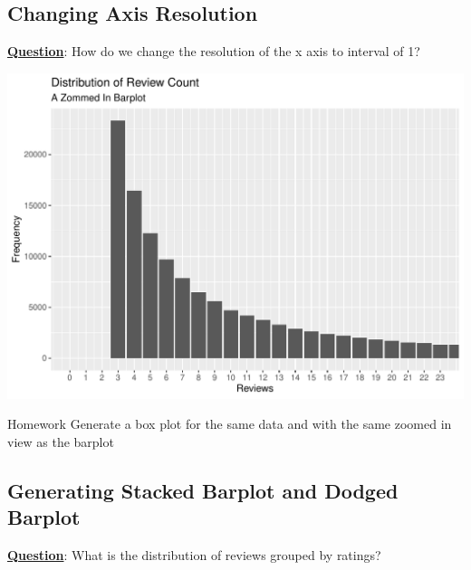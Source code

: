 \documentclass[12pt]{book}\usepackage{knitr}
\begin{document}
\subsection{Changing Axis Resolution}
\noindent \textbf{\underline{Question}}: How do we change the resolution of the x axis to interval of 1?
\begin{knitrout}
\color{fgcolor}\begin{kframe}
\begin{alltt}
 \hlkwb{<-}  \hlopt{+}
\hlstd{(}
                    \hlstd{=} \hlstd{(}\hlstd{)}
                  \hlstd{)}  
\end{alltt}


{\ttfamily\noindent\color{warningcolor}{\#\# Warning: Use of `cleansedBusiness\$review\_count` is discouraged. Use `review\_count` instead.}}\end{kframe}
\includegraphics[width=\maxwidth]{figure/Change_Axis_Resolution-1} 

\end{knitrout}

\begin{DIY}{Homework}
\noindent Generate a box plot for the same data and with the same zoomed in view as the barplot
\end{DIY}




\newpage
\subsection{Generating Stacked Barplot and Dodged Barplot}
\noindent \textbf{\underline{Question}}: What is the distribution of reviews grouped by ratings?
\end{document}
